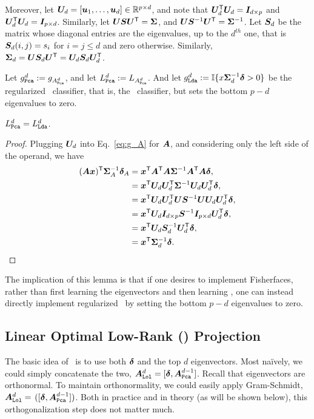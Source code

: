 \documentclass[10pt]{article}
\begin{document}
Moreover, let $\bU_d=[\bu_1,\ldots,\bu_d] \in \Real^{p \times d}$, and note that $\bU_d\T \bU_d = \bI_{d \times p}$ and $\bU_d\T \bU_d  = \bI_{p \times d}$.  Similarly, let $\bU \bS \bU\T = \bSig$, and $\bU \bS^{-1} \bU\T = \bSig^{-1}$.  Let $\bS_d$ be the matrix whose diagonal entries are the eigenvalues, up to the $d^{th}$ one, that is $\bS_d(i,j)=s_i$ for $i=j \leq d$ and zero otherwise.  Similarly, $\bSig_d=\bU \bS_d \bU\T=\bU_d \bS_d \bU_d\T$.

Let $g_{\Pca}^d:=g_{A_{\Pca}^d}$, and let $L_{\Pca}^d:=L_{A_{\Pca}^d}$.
And let $g_{\Lda}^d := \II \{ x \bSig_d^{-1} \bdel > 0\}$ be the regularized \Lda~classifier, that is, the \Lda~classifier, but sets the bottom $p-d$ eigenvalues to zero.

\begin{lem}
$L_{\Pca}^d = L_{\Lda}^d$.
\end{lem}

\begin{proof}
Plugging $\bU_d$ into Eq.~\eqref{eq:g_A} for $\bA$, and considering only the left side of the operand, we have
\begin{align*}
(\bA \bx)\T \bSig^{-1}_A \bdel_A &= \bx\T \bA\T \bA \bSig^{-1} \bA\T \bA \bdel,
\\&= \bx\T  \bU_d\bU_d\T \bSig^{-1} \bU_d\bU_d\T \bdel,
\\&= \bx\T  \bU_d \bU_d\T \bU \bS^{-1} \bU \bU_d\bU_d\T \bdel,
\\&= \bx\T  \bU_d \bI_{d \times p} \bS^{-1} \bI_{p \times d} \bU_d\T \bdel,
\\&= \bx\T  \bU_d \bS^{-1}_d  \bU_d\T \bdel ,
\\&= \bx\T  \bSig^{-1}_d  \bdel.
\end{align*}
\end{proof}

The implication of this lemma is that if one desires to implement Fisherfaces, rather than first learning the eigenvectors and then learning \Lda, one can instead directly implement regularized \Lda~by setting the bottom $p-d$ eigenvalues to zero.




\subsection[LOL]{Linear Optimal Low-Rank (\Lol) Projection}


The basic idea of \Lol~is to use both $\bdel$ and the top $d$ eigenvectors.  Most na\"ively, we could simply concatenate the two, $\bA_{\Lol}^d=[\bdel,\bA_{\Pca}^{d-1}]$.
Recall that eigenvectors are orthonormal.  To maintain orthonormality, we could easily apply Gram-Schmidt,  $\bA_{\Lol}^d=$ $([\bdel, \bA_{\Pca}^{d-1}])$.
Both in practice and in theory (as will be shown below), this orthogonalization step does not matter much.
\end{document}
